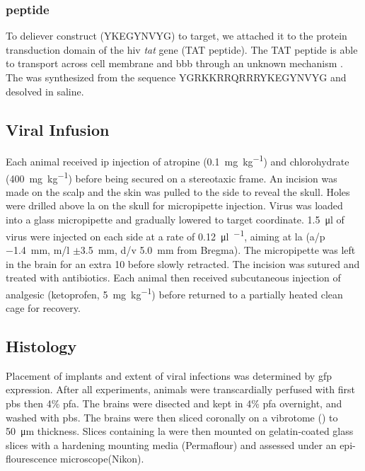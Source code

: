 \subsubsection{\tglu peptide}
To deliever \glu construct (YKEGYNVYG) to target, we attached it to the protein transduction domain of the \gls{hiv} \textit{tat} gene (TAT peptide). The TAT peptide is able to transport across cell membrane and \gls{bbb} through an unknown mechanism . The \tglu was synthesized from the sequence YGRKKRRQRRRYKEGYNVYG and desolved in saline. 


\subsection{Viral Infusion}

Each animal received \gls{ip} injection of atropine (\SI{0.1}{\mg\per\kg}) and chlorohydrate (\SI{400}{\mg\per\kg}) before being secured on a stereotaxic frame. An incision was made on the scalp and the skin was pulled to the side to reveal the skull. Holes were drilled above \gls{la} on the skull for micropipette injection. Virus was loaded into a glass micropipette and gradually lowered to target coordinate. \SI{1.5}{\ul} of virus were injected on each side at a rate of \SI{0.12}{\ul\per\min}, aiming at \gls{la} (\gls{a/p} \SI{-1.4}{\mm}, \gls{m/l} $\pm$\SI{3.5}{\mm}, \gls{d/v} \SI{5.0}{\mm} from Bregma). The micropipette was left in the brain for an extra \SI{10}{\min} before slowly retracted. The incision was sutured and treated with antibiotics. Each animal then received subcutaneous injection of analgesic (ketoprofen, \SI{5}{\mg\per\kg}) before returned to a partially heated clean cage for recovery.

\subsection{Histology}
Placement of implants and extent of viral infections was determined by \gls{gfp} expression. After all experiments, animals were transcardially perfused with first \gls{pbs} then 4\% \gls{pfa}. The brains were disected and kept in 4\% \gls{pfa} overnight, and washed with \gls{pbs}. The brains were then sliced coronally on a vibrotome () to \SI{50}{\um} thickness. Slices containing \gls{la} were then mounted on gelatin-coated glass slices with a hardening mounting media (Permaflour) and assessed under an epi-flourescence microscope(Nikon).

